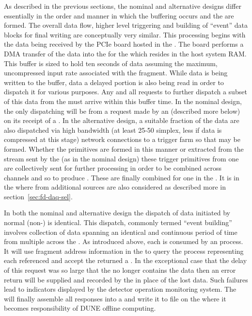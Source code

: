 As described in the previous sections, the nominal and alternative
designs differ essentially in the order and manner in which the
 buffering occurs and the  are
formed. 
The overall data flow, higher level triggering and building of
``event'' data blocks for final writing are conceptually very similar.
This processing begins with the data being received by the
 PCIe board hosted in the . 
The  board performs a DMA transfer of the data into the
 for the  which resides in the
 host system RAM.
This buffer is sized to hold ten seconds of data assuming the maximum,
uncompressed input rate associated with the fragment.
While data is being written to the buffer, data a delayed portion is
also being read in order to dispatch it for various purposes.
Any and all requests to further dispatch a subset of this data from
the  must arrive within this buffer time.
In the nominal design, the only dispatching will be from a request
made by an  (described more below) on its receipt of a
. 
In the alternative design, a suitable fraction of the data are also
dispatched via high bandwidth (at least 25-50 \si{\Gbps} simplex, less
if data is compressed at this stage) network connections to a trigger
farm so that  may be formed. 
Whether the primitives are formed in this manner or extracted from the
stream sent by the  (as in the nominal design) these
trigger primitives from one  are collectively sent for
further processing in order to be combined across channels and so to
produce . 
These are finally combined for one  in the
. 
It is in the  where  from additional
sources are also considered as described more in
section~\ref{sec:fd-daq-sel}.

In both the nominal and alternative design the dispatch of data
initiated by normal (non-)  is
identical. 
This dispatch, commonly termed ``event building'' involves collection
of data spanning an identical and continuous period of time from
multiple  across the .
As introduced above, each  is consumed by an
 process. 
It will use fragment address information in the  to
query the  process representing each referenced
 and accept the returned a .
In the exceptional case that the delay of this request was so large
that the  no longer contains the data then an error
return will be supplied and recorded by the  in place of the
lost data. 
Such failures lead to indicators displayed by the detector operation
monitoring system.
The  will finally assemble all responses into a
 and write it to file on the  where
it becomes responsibility of DUNE offline computing.

